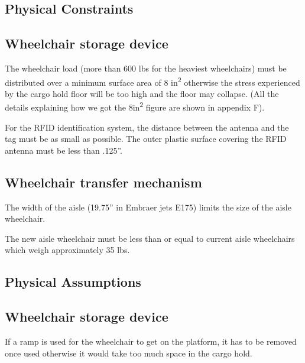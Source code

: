 \subsection{Physical Constraints}

\subsection*{Wheelchair storage device}

\begin{list}{-}{}
  \item The wheelchair load (more than 600 lbs for the heaviest wheelchairs) must be distributed over a minimum surface area of 8 in\textsuperscript{2} otherwise the stress experienced by the cargo hold floor will be too high and the floor may collapse. (All the details explaining how we got the 8in\textsuperscript{2} figure are shown in appendix F).
  \item For the RFID identification system, the distance between the antenna and the tag must be as small as possible. The outer plastic surface covering the RFID antenna must be less than .125''.
\end{list}

\subsection*{Wheelchair transfer mechanism}

\begin{list}{-}{}
  \item The width of the aisle (19.75'' in Embraer jets E175) limits the size of the aisle wheelchair.
  \item The new aisle wheelchair must be less than or equal to current aisle wheelchairs which weigh approximately 35 lbs.
\end{list}

\subsection{Physical Assumptions}

\subsection*{Wheelchair storage device}

\begin{list}{-}{}
  \item If a ramp is used for the wheelchair to get on the platform, it has to be removed once used otherwise it would take too much space in the cargo hold.
\end{list}

